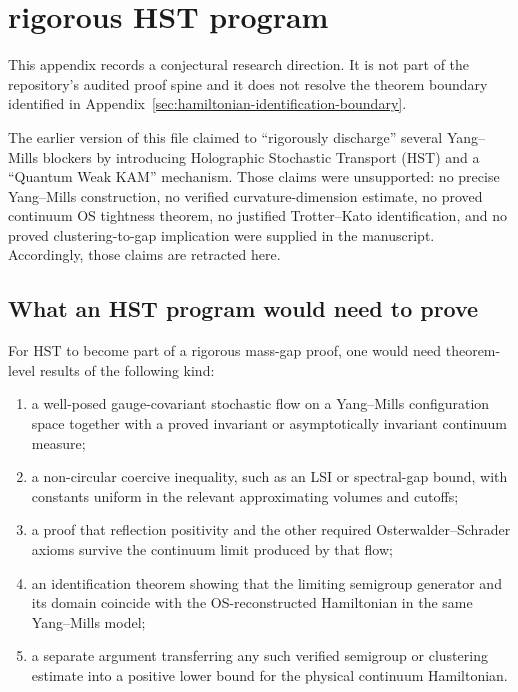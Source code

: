 \section{rigorous HST program}
\label{app:hst_rigorous}

This appendix records a conjectural research direction. It is not part of the
repository's audited proof spine and it does not resolve the theorem boundary
identified in Appendix~\ref{sec:hamiltonian-identification-boundary}.

The earlier version of this file claimed to ``rigorously discharge'' several
Yang--Mills blockers by introducing Holographic Stochastic Transport (HST) and a
``Quantum Weak KAM'' mechanism. Those claims were unsupported: no precise
Yang--Mills construction, no verified curvature-dimension estimate, no proved
continuum OS tightness theorem, no justified Trotter--Kato identification, and
no proved clustering-to-gap implication were supplied in the manuscript.
Accordingly, those claims are retracted here.

\subsection{What an HST program would need to prove}
For HST to become part of a rigorous mass-gap proof, one would need theorem-level
results of the following kind:
\begin{enumerate}
\item a well-posed gauge-covariant stochastic flow on a Yang--Mills configuration
space together with a proved invariant or asymptotically invariant continuum
measure;
\item a non-circular coercive inequality, such as an LSI or spectral-gap bound,
with constants uniform in the relevant approximating volumes and cutoffs;
\item a proof that reflection positivity and the other required
Osterwalder--Schrader axioms survive the continuum limit produced by that flow;
\item an identification theorem showing that the limiting semigroup generator and
its domain coincide with the OS-reconstructed Hamiltonian in the same
Yang--Mills model;
\item a separate argument transferring any such verified semigroup or clustering
estimate into a positive lower bound for the physical continuum Hamiltonian.
\end{enumerate}

